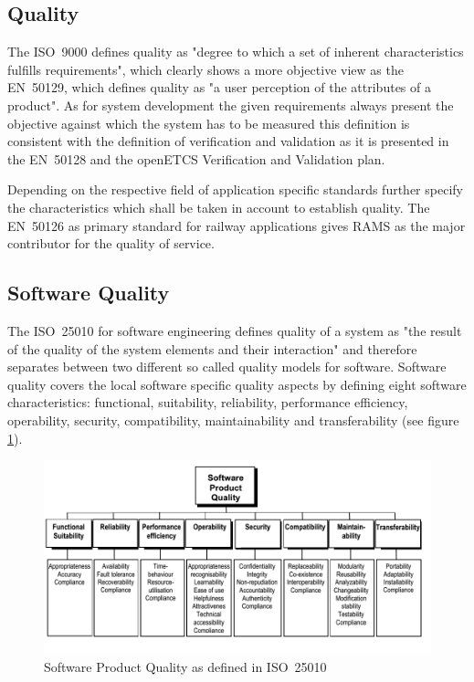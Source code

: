 \documentclass{template/openetcs_report}
\begin{document}
\subsection{Quality}

The ISO~9000 defines quality as "degree to which a set of inherent characteristics fulfills requirements", which clearly shows a more objective view as the EN~50129, which defines quality as "a user perception of the attributes of a product". As for system development the given requirements always present the objective against which the system has to be measured this definition is consistent with the definition of verification and validation as it is presented in the EN~50128 and the openETCS Verification and Validation plan.

Depending on the respective field of application specific standards further specify the characteristics which shall be taken in account to establish quality. The EN~50126 as primary standard for railway applications gives RAMS as the major contributor for the quality of service. 

\subsection{Software Quality}

The ISO~25010 for software engineering defines quality of a system as "the result of the quality of the system elements and their interaction" and therefore separates between two different so called quality models for software. Software quality covers the local software specific quality aspects by defining eight software characteristics: functional, suitability, reliability, performance efficiency, operability, security, compatibility, maintainability and transferability (see figure \ref{fig:Software-Product-Quality-eng}).

\begin{figure}[htbp]
\centering
\includegraphics[width=0.8\linewidth]{Software-Product-Quality-eng}
\caption{Software Product Quality as defined in ISO~25010}
\label{fig:Software-Product-Quality-eng}
\end{figure}
\end{document}
